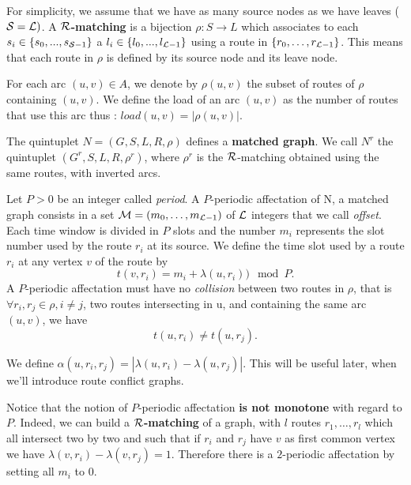 \documentclass{article}
\newcommand\rmatching{$\cal R$-matching\xspace}
\newcommand\matchedgraph{{\bf matched graph}}
\begin{document}
For simplicity, we assume that we have as many source nodes as we have leaves (${\cal S} = {\cal L})$.
A {\bf ${\cal R}$-matching} is a bijection $\rho :S\rightarrow L$ which associates to each $s_i \in \{s_0,...,s_{{\cal S}-1}\}$ a $l_i \in \{l_0,...,l_{{\cal L}-1}\}$
using a route in $\{r_0, \ldots ,r_{{\cal L}-1}\}$.
This means that each route in $\rho$ is defined by its source node and its leave node.




For each arc $(u,v) \in A$, we denote by ${\rho}(u,v)$ the subset of routes of $\rho$  containing $(u,v)$.
We define the load of an arc $(u,v)$ as the number of routes that use this arc thus : $load(u,v) = |\rho(u,v)|$.

The quintuplet $N=(G,S,L,R,\rho)$ defines a \matchedgraph. We call $N^r$ the quintuplet $(G^r,S,L,R,\rho^r)$, 
where $\rho^r$ is the \rmatching obtained using the same routes, with inverted arcs.

Let $P>0$ be an integer called {\em period}. 
A $P$-periodic affectation of N, a matched graph consists in a set  ${\cal M}=(m_0, \ldots ,m_{{\cal L}-1})$ of ${\cal L}$ integers that we call \emph{offset}. 
Each time window is divided in $P$ slots and the number $m_i$ represents the slot number used by the route $r_i$ at its source.
We define the time slot used by a route $r_i$ at any vertex $v$ of the route by $$t(v,r_i) = m_i+\lambda(u,r_i)) \mod P.$$
A $P$-periodic affectation must have no {\em collision} between two routes in $\rho$, that is $\forall r_i, r_j \in \rho, i \ne j$, two routes intersecting in u,
and containing the same arc $(u,v)$, we have $$t(u,r_i)\ne t(u,r_j) .$$

We define $\alpha(u,r_i,r_j) = | \lambda(u,r_i)-\lambda(u,r_j)|$. This will be useful later, when we'll introduce route conflict graphs.
 


Notice that the notion of $P$-periodic affectation \textbf{is not monotone} with regard to $P$. 
Indeed, we can build a {\bf ${\cal R}$-matching} of a graph, with $l$ routes $r_1, \dots, r_l$ which all intersect two by two and
such that if $r_i$ and $r_j$ have $v$ as first common vertex we have $\lambda(v,r_i) - \lambda(v,r_j)=1$.
Therefore there is a $2$-periodic affectation by setting all $m_i$ to $0$.
\end{document}
